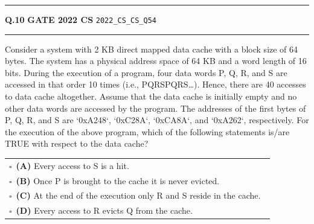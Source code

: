 \documentclass[a4paper,10pt]{article}
\begin{document}
\vspace{6pt}\hrule height 0.35pt\vspace{6pt}
\noindent
\begin{tcolorbox}[
    blanker,
    sidebyside,
    sidebyside align=top,
    lefthand width=0.55\textwidth,
    top=4pt, bottom=4pt, left=0pt, right=0pt,
    middle=16pt,
    underlay={
        \draw[dashed, black!80, line width=0.8pt, dash pattern=on 4pt off 3pt]
            ([xshift=0.55\textwidth+8pt]frame.north west) --
            ([xshift=0.55\textwidth+8pt]frame.south west);
    }
]
\textbf{Q.10}  \hfill {\footnotesize\textbf{GATE 2022 CS} \quad \tiny\texttt{2022\_CS\_CS\_Q54}}
\vspace{2pt}\hrule height 0.3pt\vspace{4pt}

Consider a system with 2 KB direct mapped data cache with a block size of 64 bytes. The system has a physical address space of 64 KB and a word length of 16 bits. During the execution of a program, four data words P, Q, R, and S are accessed in that order 10 times (i.e., PQRSPQRS\dots). Hence, there are 40 accesses to data cache altogether. Assume that the data cache is initially empty and no other data words are accessed by the program. The addresses of the first bytes of P, Q, R, and S are `0xA248`, `0xC28A`, `0xCA8A`, and `0xA262`, respectively. For the execution of the above program, which of the following statements is/are TRUE with respect to the data cache?

\par\vspace{6pt}\noindent
\begin{tabular}{@{}p{0.98\linewidth}@{}}
$\square$\ \textbf{(A)} Every access to S is a hit. \\
\addlinespace[3pt]
$\square$\ \textbf{(B)} Once P is brought to the cache it is never evicted. \\
\addlinespace[3pt]
$\square$\ \textbf{(C)} At the end of the execution only R and S reside in the cache. \\
\addlinespace[3pt]
$\square$\ \textbf{(D)} Every access to R evicts Q from the cache.
\end{tabular}

\tcblower


\end{tcolorbox}
\end{document}
